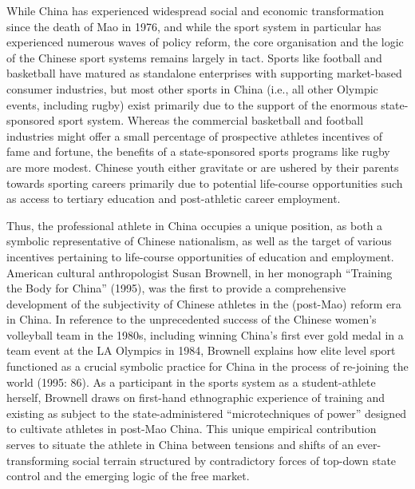 \begin{CJK}{UTF8}{gbsn}
 While China has experienced widespread social and economic transformation since the death of Mao in 1976, and while the sport system in particular has experienced numerous waves of policy reform,  the core organisation and the logic of the Chinese sport systems remains largely in tact.  Sports like football and basketball have matured as standalone enterprises with supporting market-based consumer industries, but most other sports in China (i.e., all other Olympic events, including rugby) exist primarily due to the support of the enormous state-sponsored sport system.  Whereas the commercial basketball and football industries might offer a small percentage of prospective athletes incentives of fame and fortune, the benefits of a state-sponsored sports programs like rugby are more modest.  Chinese youth either gravitate or are ushered by their parents towards sporting careers primarily due to potential life-course opportunities such as access to tertiary education and post-athletic career employment.

 Thus, the professional athlete in China occupies a unique position, as both a symbolic representative of Chinese nationalism, as well as the target of various incentives pertaining to life-course opportunities of education and employment.  American cultural anthropologist Susan Brownell, in her monograph ``Training the Body for China'' (1995), was the first to provide a comprehensive development of the subjectivity of Chinese athletes in the (post-Mao) reform era in China.  In reference to the unprecedented success of the Chinese women's volleyball team in the 1980s, including winning China's first ever gold medal in a team event at the LA Olympics in 1984, Brownell explains how elite level sport functioned as a crucial symbolic practice for China in the process of re-joining the world (1995: 86).  As a participant in the sports system as a student-athlete herself, Brownell draws on first-hand ethnographic experience of training and existing as subject to the state-administered ``microtechniques of power'' \citep[citing][]{Foucault1977} designed to cultivate athletes in post-Mao China.  This unique empirical contribution serves to situate the athlete in China between tensions and shifts of an ever-transforming social terrain structured by contradictory forces of top-down state control and the emerging logic of the free market.


\end{CJK}
